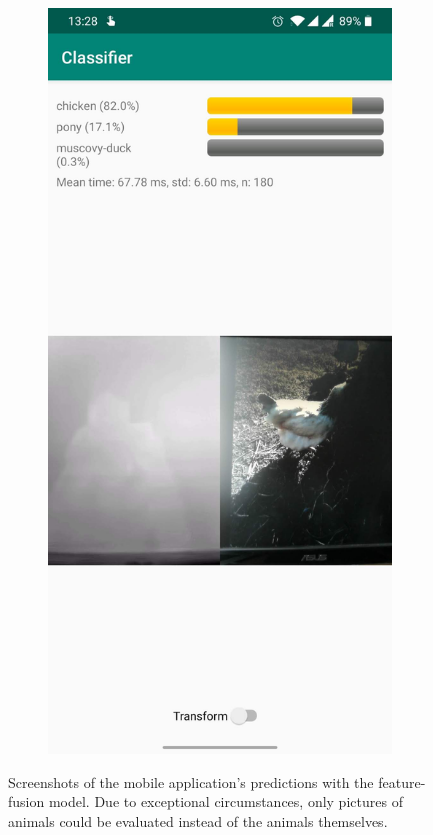\documentclass{l4proj}
\begin{document}
\begin{figure}[ht]
\begin{subfigure}[h!]{0.3\textwidth}
  \end{subfigure}
  \begin{subfigure}[h!]{0.3\textwidth}
    \includegraphics[width=\textwidth, trim={0cm, 22cm, 0cm, 0cm}, clip]{images/app/screenshot_2.jpg}
  \end{subfigure}
  \caption{Screenshots of the mobile application's predictions with the feature-fusion model. Due to exceptional circumstances, only pictures of animals could be evaluated instead of the animals themselves.}
  \label{fig:app_screenshots}
\end{figure}
\end{document}
